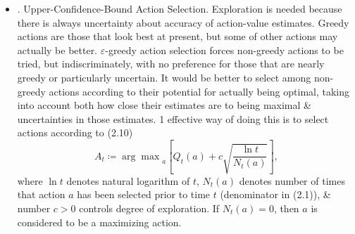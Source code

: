 \documentclass{article}
\newtheorem{problem}{Problem}
\begin{document}
\begin{itemize}
\begin{itemize}
\begin{problem}[Unbiased Constant-Step-Size Trick.]
            -- Trong hầu hết chương này, chúng tôi đã sử dụng trung bình mẫu để ước tính giá trị hành động vì trung bình mẫu không tạo ra độ lệch ban đầu như kích thước bước không đổi (xem phân tích dẫn đến (2.6)). Tuy nhiên, trung bình mẫu không phải là 1 giải pháp hoàn toàn thỏa đáng vì chúng có thể hoạt động kém trong các bài toán không dừng. Liệu có thể tránh được độ lệch của kích thước bước không đổi trong khi vẫn giữ được ưu điểm của chúng trong các bài toán không dừng không? Cách 1: sử dụng kích thước bước $\beta_n\coloneqq\frac{\alpha}{\overline{o}_n}$, để xử lý phần thưởng thứ $n$ cho 1 hành động cụ thể, trong đó $\alpha > 0$ là kích thước bước không đổi thông thường, \& $\overline{o}_n$ là dấu vết của 1 bắt đầu từ 0:
            \begin{equation*}
                \overline{o}_n\coloneqq\overline{o}_{n-1} + \alpha(1 - \overline{o}_{n-1}),\ \forall n\in\mathbb{N}^\star,\mbox{ với }\overline{o}_n\coloneqq0.
            \end{equation*}
            Thực hiện phân tích tương tự như trong (2.6) để chứng minh: $Q_n$ là trung bình trọng số mũ gần đây {\rm không có độ lệch ban đầu}.
        \end{problem}
        \item {. Upper-Confidence-Bound Action Selection.} Exploration is needed because there is always uncertainty about accuracy of action-value estimates. Greedy actions are those that look best at present, but some of other actions may actually be better. $\varepsilon$-greedy action selection forces non-greedy actions to be tried, but indiscriminately, with no preference for those that are nearly greedy or particularly uncertain. It would be better to select among non-greedy actions according to their potential for actually being optimal, taking into account both how close their estimates are to being maximal \& uncertainties in those estimates. 1 effective way of doing this is to select actions according to (2.10)
        \begin{equation*}
            A_t\coloneqq{\arg\max}_a\left[Q_t(a) + c\sqrt{\frac{\ln t}{N_t(a)}}\right],
        \end{equation*}
        where $\ln t$ denotes natural logarithm of $t$, $N_t(a)$ denotes number of times that action $a$ has been selected prior to time $t$ (denominator in (2.1)), \& number $c > 0$ controls degree of exploration. If $N_t(a) = 0$, then $a$ is considered to be a maximizing action.


\end{itemize}
\end{itemize}
\end{document}
